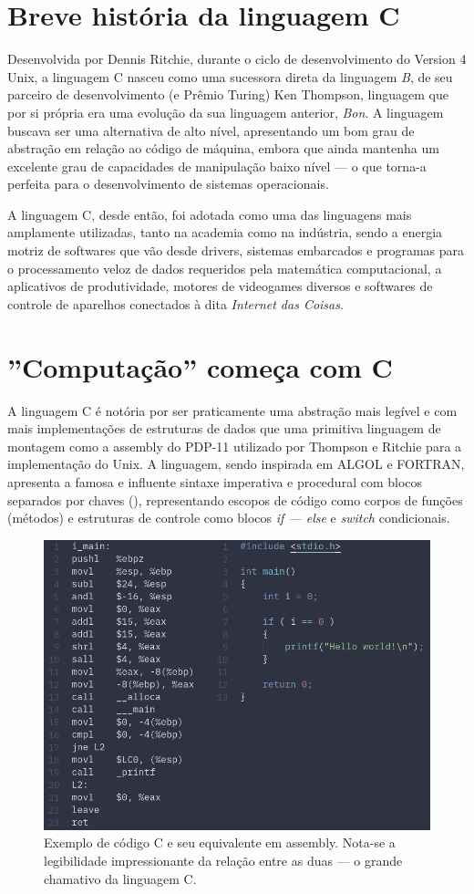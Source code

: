 \documentclass[
	12pt,				%
	openright,			%
	twoside,			%
	a4paper,			%
	english,			%
	french,				%
	spanish,			%
	brazil				%
	]{abntex2}
\begin{document}
\chapter{Breve história da linguagem C}

Desenvolvida por Dennis Ritchie, durante o ciclo de desenvolvimento do Version 4 Unix, a linguagem C nasceu como uma sucessora direta da linguagem \textit{B}, de seu parceiro de desenvolvimento (e Prêmio Turing) Ken Thompson, linguagem que por si própria era uma evolução da sua linguagem anterior, \textit{Bon}. A linguagem buscava ser uma alternativa de alto nível, apresentando um bom grau de abstração em relação ao código de máquina, embora que ainda mantenha um excelente grau de capacidades de manipulação baixo nível --- o que torna-a perfeita para o desenvolvimento de sistemas operacionais. \par
A linguagem C, desde então, foi adotada como uma das linguagens mais amplamente utilizadas, tanto na academia como na indústria, sendo a energia motriz de softwares que vão desde drivers, sistemas embarcados e programas para o processamento veloz de dados requeridos pela matemática computacional, a aplicativos de produtividade, motores de videogames diversos e softwares de controle de aparelhos conectados à dita \textit{Internet das Coisas}. \par


\chapter{''Computação'' começa com C}

A linguagem C é notória por ser praticamente uma abstração mais legível e com mais implementações de estruturas de dados que uma primitiva linguagem de montagem como a assembly do PDP-11 utilizado por Thompson e Ritchie para a implementação do Unix. A linguagem, sendo inspirada em ALGOL e FORTRAN, apresenta a famosa e influente sintaxe imperativa e procedural com blocos separados por chaves ({}), representando escopos de código como corpos de funções (métodos) e estruturas de controle como blocos \textit{if --- else} e \textit{switch} condicionais. \par

\begin{figure}[h]
\centering
\includegraphics[width=0.6\linewidth]{exemplo.png}
\caption{Exemplo de código C e seu equivalente em assembly. Nota-se a legibilidade impressionante da relação entre as duas --- o grande chamativo da linguagem C.}
\label{fig:exemplo.png}
\end{figure}
\end{document}
